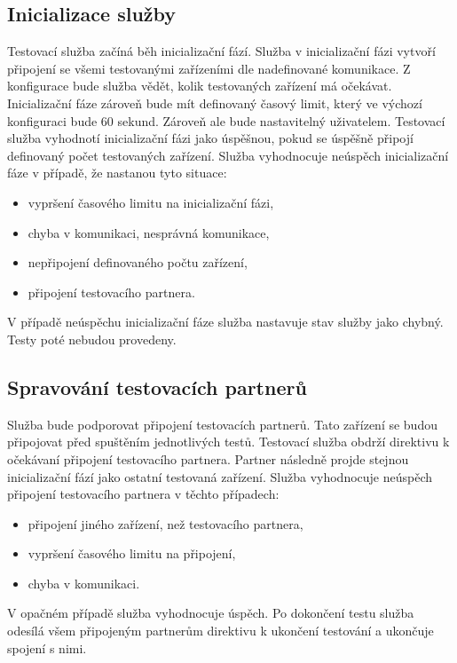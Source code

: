 \subsection{Inicializace služby}
Testovací služba začíná běh inicializační fází. Služba v inicializační fázi vytvoří připojení se všemi testovanými zařízeními dle nadefinované komunikace. Z konfigurace bude služba vědět, kolik testovaných zařízení má očekávat. Inicializační fáze zároveň bude mít definovaný časový limit, který ve výchozí konfiguraci bude 60 sekund. Zároveň ale bude nastavitelný uživatelem. Testovací služba vyhodnotí inicializační fázi jako úspěšnou, pokud se úspěšně připojí definovaný počet testovaných zařízení. Služba vyhodnocuje neúspěch inicializační fáze v případě, že nastanou tyto situace:

\begin{itemize}
    \item vypršení časového limitu na inicializační fázi,
    \item chyba v komunikaci, nesprávná komunikace,
    \item nepřipojení definovaného počtu zařízení,
    \item připojení testovacího partnera.
\end{itemize}

V případě neúspěchu inicializační fáze služba nastavuje stav služby jako chybný. Testy poté nebudou provedeny.

\subsection{Spravování testovacích partnerů}
Služba bude podporovat připojení testovacích partnerů. Tato zařízení se budou připojovat před spuštěním jednotlivých testů. Testovací služba obdrží direktivu k očekávaní připojení testovacího partnera. Partner následně projde stejnou inicializační fází jako ostatní testovaná zařízení. Služba vyhodnocuje neúspěch připojení testovacího partnera v těchto případech:

\begin{itemize}
    \item připojení jiného zařízení, než testovacího partnera,
    \item vypršení časového limitu na připojení,
    \item chyba v komunikaci.
\end{itemize}

V opačném případě služba vyhodnocuje úspěch. Po dokončení testu služba odesílá všem připojeným partnerům direktivu k ukončení testování a ukončuje spojení s nimi. 


